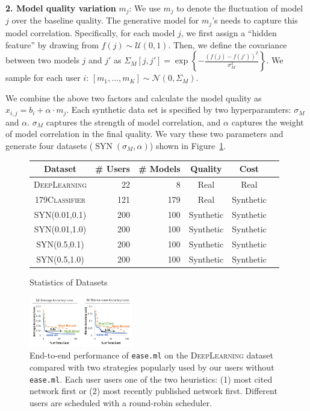 \documentclass[letterpaper]{vldb}
\DeclareMathOperator{\SYN}{SYN}
\begin{document}
\noindent
{\bf 2. Model quality variation} $m_j$: 
We use $m_j$ to denote the fluctuation of model $j$
over the baseline quality. The generative model for 
$m_j$'s needs to capture this model correlation.
Specifically, for each model $j$, we first assign a 
``hidden feature'' by drawing
from $f(j)\sim\mathcal{U}(0,1)$.
Then, we define the covariance between 
two models $j$ and $j'$ as 
$\Sigma_M[j, j']=\exp \left\{-\frac{(f(j) - f(j'))^2}{\sigma_M^2} \right\}$. We sample
for each user $i$: $
[m_1,...,m_K] \sim \mathcal{N}(0, \Sigma_M)$.

We combine the above two factors and 
calculate the model quality as $x_{i,j} = b_i + \alpha\cdot m_j$. Each synthetic data
set is specified by two hyperparamters:
$\sigma_M$ and $\alpha$. $\sigma_M$ captures
the strength of model correlation, and $\alpha$
captures the weight of model correlation in
the final quality. We vary these two
parameters and generate four datasets
($\SYN(\sigma_M, \alpha)$) shown in Figure~\ref{tab:datasets}.


\begin{figure}
\centering
\small
\begin{tabular}{c | r r | c c c}
\hline
{\bf Dataset} & {\bf \# Users} & {\bf \# Models} & {\bf Quality} & {\bf Cost} \\
\hline
\textsc{DeepLearning} & 22 & 8 & Real & Real \\
\textsc{179Classifier} & 121 & 179 & Real & Synthetic \\
\hline
\textsc{SYN(0.01,0.1)} & 200 & 100 & Synthetic & Synthetic \\
\textsc{SYN(0.01,1.0)} & 200 & 100 & Synthetic & Synthetic \\
\textsc{SYN(0.5,0.1)} & 200 & 100 & Synthetic & Synthetic \\
\textsc{SYN(0.5,1.0)} & 200 & 100 & Synthetic & Synthetic \\
\hline
\end{tabular}
\vspace{-1em}
\caption{Statistics of Datasets}
\label{tab:datasets}
\vspace{-1em}
\end{figure}

\begin{figure}[t!]
\centering
\includegraphics[width=0.4\textwidth]{figures/main}
\vspace{-1.5em}
\caption{End-to-end performance of
\texttt{ease.ml} on the
\textsc{DeepLearning} dataset
compared with two strategies
popularly used by our users 
without \texttt{ease.ml}. 
Each user users one of
the two heuristics:
(1) most cited network first or
(2) most recently published network first. 
Different users are
scheduled with a round-robin scheduler.}
\label{fig:end-to-end}
\vspace{-1em}
\end{figure}
\end{document}

